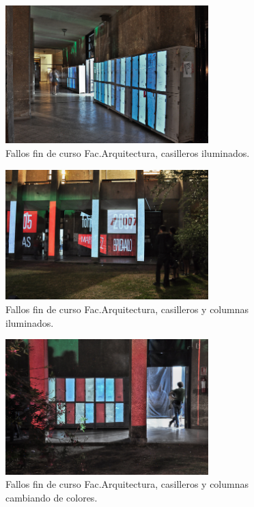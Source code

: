 \begin{figure}[H]
  \centering
    \includegraphics[width=0.7\textwidth]{./Cap7_conclusiones/Arqui1.jpg}
  \caption[Fallos fin de curso Fac.Arquitectura, casilleros iluminados.]{Fallos fin de curso Fac.Arquitectura, casilleros iluminados.}
  \label{fig:Arquitectura1}
\end{figure}

\begin{figure}[H]
  \centering
    \includegraphics[width=0.7\textwidth]{./Cap7_conclusiones/Arqui2.jpg}
  \caption[Fallos fin de curso Fac.Arquitectura, casilleros y columnas iluminados.]{Fallos fin de curso Fac.Arquitectura, casilleros y columnas iluminados.}
  \label{fig:Arquitectura2}
\end{figure}

\begin{figure}[H]
  \centering
    \includegraphics[width=0.7\textwidth]{./Cap7_conclusiones/Arqui3.jpg}
  \caption[Fallos fin de curso Fac.Arquitectura, casilleros y columnas cambiando de colores.]{Fallos fin de curso Fac.Arquitectura, casilleros y columnas cambiando de colores.}
  \label{fig:Arquitectura3}
\end{figure}

